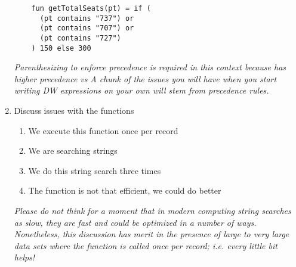 \begin{enumerate}[resume*]
  \begin{lstlisting}
    fun getTotalSeats(pt) = if (
      (pt contains "737") or
      (pt contains "707") or
      (pt contains "727")
    ) 150 else 300
  \end{lstlisting}
  \emph{
    Parenthesizing to enforce precedence is required in this context because  has higher precedence vs 
  }
  \emph{
    A chunk of the issues you will have when you start writing DW expressions on your own will stem from precedence rules.
  }
\item Discuss issues with the  functions
  \begin{enumerate}
  \item We execute this function once per record
  \item We are searching strings
  \item We do this string search three times
  \item The function is not that efficient, we could do better
  \end{enumerate}
  \emph{
    Please do not think for a moment that in modern computing string searches as slow, they are fast and could
    be optimized in a number of ways.  Nonetheless, this discussion has merit in the presence of large to very
    large data sets where the function is called once per record; i.e. every little bit helps!
  }
\end{enumerate}

